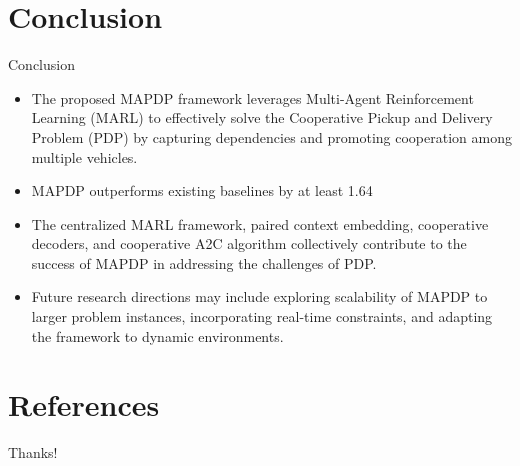 \documentclass{beamer}
\begin{document}
\section{Conclusion}

\begin{frame}{Conclusion}
	\begin{itemize}
		\item The proposed MAPDP framework leverages Multi-Agent Reinforcement Learning (MARL) to effectively solve the Cooperative Pickup and Delivery Problem (PDP) by capturing dependencies and promoting cooperation among multiple vehicles.
		\item MAPDP outperforms existing baselines by at least 1.64%
		\item The centralized MARL framework, paired context embedding, cooperative decoders, and cooperative A2C algorithm collectively contribute to the success of MAPDP in addressing the challenges of PDP.
		\item Future research directions may include exploring scalability of MAPDP to larger problem instances, incorporating real-time constraints, and adapting the framework to dynamic environments.
	\end{itemize}
\end{frame}

\section{References}

\begin{frame}[allowframebreaks]
	
	
\end{frame}

\begin{frame}
	\begin{center}
		{\Huge \calligra Thanks!}
	\end{center}
\end{frame}
\end{document}
